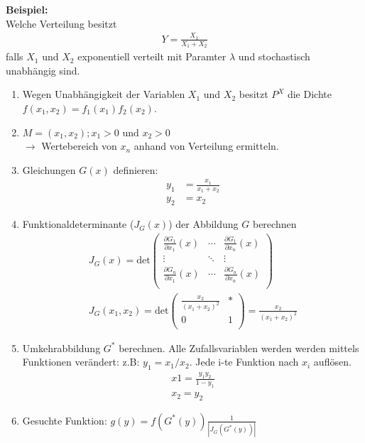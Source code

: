 \documentclass{article}
\begin{document}
\textbf{Beispiel:}\\
Welche Verteilung besitzt
\begin{align}
	Y = \frac{X_1}{X_1 + X_2}
\end{align}
falls $X_1$ und $X_2$ exponentiell verteilt mit Paramter $\lambda$ und stochastisch
unabhängig sind.

\begin{enumerate}
	\item Wegen Unabhängigkeit der Variablen $X_1$ und $X_2$ besitzt $P^X$
		die Dichte $f(x_1,x_2) = f_1(x_1)f_2(x_2)$.
	\item $M = {(x_1, x_2); x_1 > 0 \text{ und } x_2 > 0}$\\
		$\longrightarrow$ Wertebereich von $x_n$ anhand von Verteilung ermitteln.
	\item Gleichungen  $G(x)$ definieren:
		\begin{align}
			y_1 &= \frac{x_1}{x_1 + x_2}\\
			y_2 &= x_2
		\end{align}
	\item Funktionaldeterminante ($J_{G}(x)$) der Abbildung $G$ berechnen
		\begin{align}
			J_{G}(x) =
			\text{det} \begin{pmatrix}
				\frac{\partial G_1}{\partial x_1} (x) & \cdots & \frac{\partial G_1}{\partial x_n} (x) \\
				\vdots  & \ddots & \vdots  \\
				\frac{\partial G_n}{\partial x_1} (x) & \cdots & \frac{\partial G_n}{\partial x_n} (x) \\
			\end{pmatrix}\\
			J_{G}(x_1,x_2) =
			\text{det} \begin{pmatrix}
				\frac{x_2}{(x_1 + x_2)^2} & * \\
				0 & 1 \\
			\end{pmatrix} = \frac{x_2}{(x_1 + x_2)^2}
		\end{align}
	\item Umkehrabbildung $G^*$ berechnen. Alle Zufallsvariablen werden
		werden mittels Funktionen verändert: z.B: $y_1 = x_1/x_2$.
		Jede i-te Funktion nach $x_i$ auflösen.
		\begin{align}
			x1 = \frac{y_1y_2}{1 - y_1}\\
			x_2 = y_2
		\end{align}
	\item Gesuchte Funktion: $g(y) = f(G^*(y))\frac{1}{|J_G(G^*(y))|}$\\

\end{enumerate}
\end{document}
